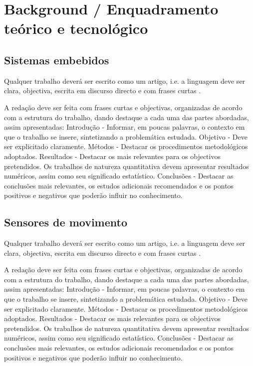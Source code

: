 % 
% 
%  


\chapter{Background / Enquadramento teórico e tecnológico}
\label{cha:background}


\section{Sistemas embebidos}
Qualquer trabalho deverá ser escrito como um artigo, i.e. a linguagem deve ser clara, objectiva, escrita em discurso directo e com frases curtas \cite{gustavii2016write, glasman2010science}.

A redação deve ser feita com frases curtas e objectivas, organizadas de acordo com a estrutura do trabalho, dando destaque a cada uma das partes abordadas, assim apresentadas: Introdução - Informar, em poucas palavras, o contexto em que o trabalho se insere, sintetizando a problemática estudada. Objetivo - Deve ser explicitado claramente. Métodos - Destacar os procedimentos metodológicos adoptados. Resultados - Destacar os mais relevantes para os objectivos pretendidos. Os trabalhos de natureza quantitativa devem apresentar resultados numéricos, assim como seu significado estatístico. Conclusões - Destacar as conclusões mais relevantes, os estudos adicionais recomendados e os pontos positivos e negativos que poderão influir no conhecimento. 


\section{Sensores de movimento}
Qualquer trabalho deverá ser escrito como um artigo, i.e. a linguagem deve ser clara, objectiva, escrita em discurso directo e com frases curtas \cite{gustavii2016write, glasman2010science}.

A redação deve ser feita com frases curtas e objectivas, organizadas de acordo com a estrutura do trabalho, dando destaque a cada uma das partes abordadas, assim apresentadas: Introdução - Informar, em poucas palavras, o contexto em que o trabalho se insere, sintetizando a problemática estudada. Objetivo - Deve ser explicitado claramente. Métodos - Destacar os procedimentos metodológicos adoptados. Resultados - Destacar os mais relevantes para os objectivos pretendidos. Os trabalhos de natureza quantitativa devem apresentar resultados numéricos, assim como seu significado estatístico. Conclusões - Destacar as conclusões mais relevantes, os estudos adicionais recomendados e os pontos positivos e negativos que poderão influir no conhecimento.

